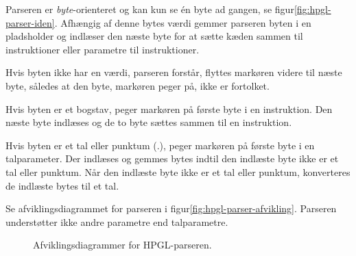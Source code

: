 Parseren er \textit{byte}-orienteret og kan kun se én byte ad gangen,
se figur\vref{fig:hpgl-parser-iden}. Afhængig af denne bytes værdi
gemmer parseren byten i en pladsholder og indlæser den næste byte for
at sætte kæden sammen til instruktioner eller parametre til
instruktioner.


Hvis byten ikke har en værdi, parseren forstår, flyttes markøren
videre til næste byte, således at den byte, markøren peger på, ikke er
fortolket.

Hvis byten er et bogstav, peger markøren på første byte i en
instruktion. Den næste byte indlæses og de to byte sættes sammen til
en instruktion.

Hvis byten er et tal eller punktum (.), peger markøren på første byte
i en talparameter. Der indlæses og gemmes bytes indtil den indlæste
byte ikke er et tal eller punktum. Når den indlæste byte ikke er et
tal eller punktum, konverteres de indlæste bytes til et tal.

Se afviklingsdiagrammet for parseren i
figur\vref{fig:hpgl-parser-afvikling}. Parseren understøtter ikke
andre parametre end talparametre.

\begin{figure}[htbp]
  \centering
  \qquad
  \caption{Afviklingsdiagrammer for HPGL-parseren.}
  \label{fig:hpgl-parser-afvikling}
\end{figure}


